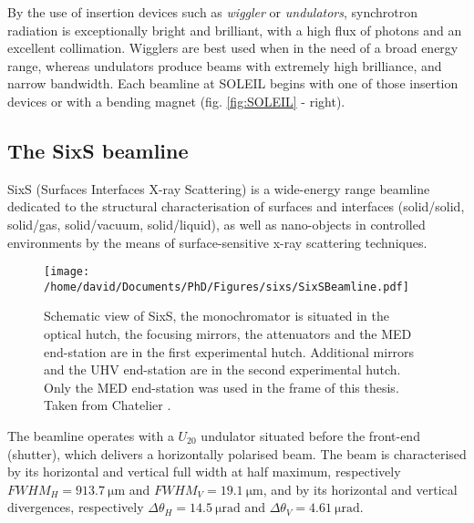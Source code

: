 By the use of insertion devices such as \textit{wiggler} or \textit{undulators}, synchrotron radiation is exceptionally bright and brilliant, with a high flux of photons and an excellent collimation.
Wigglers are best used when in the need of a broad energy range, whereas undulators produce beams with extremely high brilliance, and narrow bandwidth.
Each beamline at SOLEIL begins with one of those insertion devices or with a bending magnet (fig. \ref{fig:SOLEIL} - right).

\subsection{The SixS beamline}

SixS (Surfaces Interfaces X-ray Scattering) is a wide-energy range beamline dedicated to the structural characterisation of surfaces and interfaces (solid/solid, solid/gas, solid/vacuum, solid/liquid), as well as nano-objects in controlled environments by the means of surface-sensitive x-ray scattering techniques.

\begin{figure}[!htb]
    \centering
    \texttt{[image: /home/david/Documents/PhD/Figures/sixs/SixSBeamline.pdf]}
    \caption{
		Schematic view of SixS, the monochromator is situated in the optical hutch, the focusing mirrors, the attenuators and the MED end-station are in the first experimental hutch.
        Additional mirrors and the UHV end-station are in the second experimental hutch.
		Only the MED end-station was used in the frame of this thesis.
        Taken from Chatelier \parencite*{Chatelier2020}.
    }
    \label{fig:SixSBeamline}
\end{figure}

The beamline operates with a $U_{20}$ undulator situated before the front-end (shutter), which delivers a horizontally polarised beam.
The beam is characterised by its horizontal and vertical full width at half maximum, respectively $FWHM_H = \qty{913.7}{\um}$ and $FWHM_V = \qty{19.1}{\um}$, and by its horizontal and vertical divergences, respectively $\Delta\theta_H = \qty{14.5}{\micro\radian}$ and $\Delta\theta_V = \qty{4.61}{\micro\radian}$.

